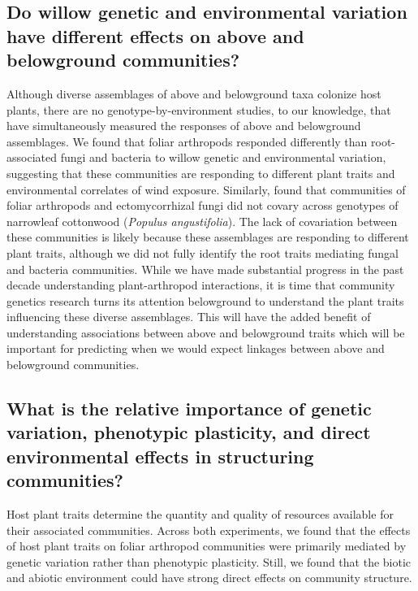 \documentclass[11pt]{article}
\begin{document}
\subsection*{Do willow genetic and environmental variation have different
effects on above and belowground
communities?}

Although diverse assemblages of above and belowground taxa colonize host
plants, there are no genotype-by-environment studies, to our knowledge,
that have simultaneously measured the responses of above and belowground
assemblages. We found that foliar arthropods responded differently than
root-associated fungi and bacteria to willow genetic and environmental
variation, suggesting that these communities are responding to different
plant traits and environmental correlates of wind exposure. Similarly,
\cite{Lamit_2015} found that communities of foliar arthropods and
ectomycorrhizal fungi did not covary across genotypes of narrowleaf
cottonwood (\emph{Populus angustifolia}). The lack of covariation
between these communities is likely because these assemblages are
responding to different plant traits, although we did not fully identify
the root traits mediating fungal and bacteria communities. While we have
made substantial progress in the past decade understanding
plant-arthropod interactions, it is time that community genetics
research turns its attention belowground to understand the plant traits
influencing these diverse assemblages. This will have the added benefit
of understanding associations between above and belowground traits which
will be important for predicting when we would expect linkages between
above and belowground communities.

\subsection*{What is the relative importance of genetic
variation, phenotypic plasticity, and direct environmental effects in
structuring
communities?}

Host plant traits determine the quantity and quality of resources available for their associated communities. Across both experiments, we found that the effects of host plant traits on foliar arthropod communities were primarily mediated by genetic variation rather than phenotypic plasticity. Still, we found that the biotic and abiotic environment could have strong direct effects on community structure.
\end{document}
